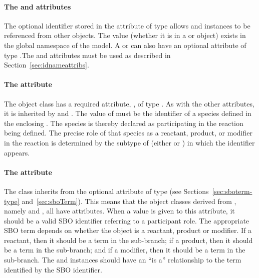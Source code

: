 \paragraph{The  and  attributes}

The optional identifier stored in the  attribute  of type
 allows \SpeciesReference and \ModifierSpeciesReference 
instances to be referenced from other objects. The  value 
(whether it is in a \SpeciesReference or \ModifierSpeciesReference object) 
exists in the global namespace of the model.   A
\SpeciesReference or \ModifierSpeciesReference can also have an 
optional  attribute of type
.The  and 
attributes must be used as described in
Section~\ref{sec:idnameattribs}.


\paragraph{The  attribute}

The \SimpleSpeciesReference object class has a required attribute,
, of type .  As with the other
attributes, it is inherited by \SpeciesReference and
\ModifierSpeciesReference.  The value of  must be the
identifier of a species defined in the enclosing \Model.  The
species is thereby declared as participating in the reaction being
defined.  The precise role of that species as a reactant, product,
or modifier in the reaction is determined by the subtype of
\SimpleSpeciesReference (\ie either \SpeciesReference or
\ModifierSpeciesReference) in which the identifier appears.


\paragraph{The  attribute}
\label{sec:simplespeciesreference-sboterm}

The class \SimpleSpeciesReference inherits from \SBase
the optional  attribute of type
 (see Sections~\ref{sec:sboterm-type}
and~\ref{sec:sboTerm}).  This means that the object classes
derived from \SimpleSpeciesReference, namely \SpeciesReference and
\ModifierSpeciesReference, all have 
attributes.  When a value is given to this
attribute, it should be a valid SBO identifier
referring to a participant role.  The appropriate SBO
term depends on whether the object is a reactant, product or
modifier.  If a reactant, then it should be a term in the
\sboreactant sub-branch; if a product, then it should be a term in
the \sboproduct sub-branch; and if a modifier, then it should be a
term in the \sbomodifier sub-branch.  The \SpeciesReference and
\ModifierSpeciesReference instances should have an ``is a''
relationship to the term identified by the SBO identifier.

